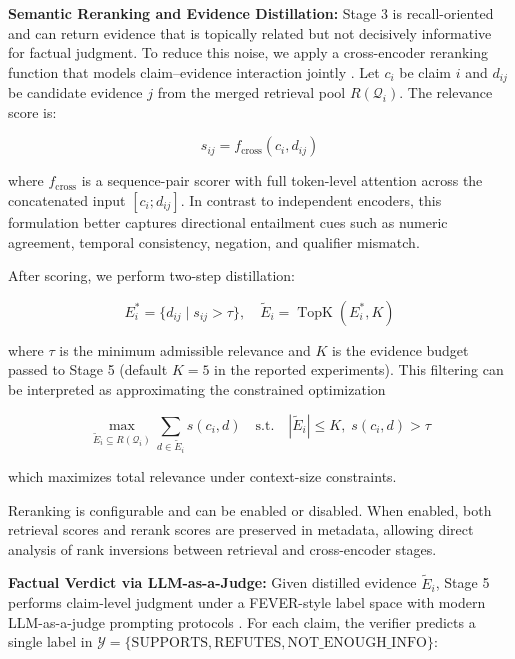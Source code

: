 \documentclass[sn-mathphys, oneside]{sn-jnl}
\begin{document}
\textbf{Semantic Reranking and Evidence Distillation:} Stage 3 is recall-oriented and can return evidence that is topically related but not decisively informative for factual judgment. To reduce this noise, we apply a cross-encoder reranking function that models claim--evidence interaction jointly \cite{nogueira2019bert,bge2023embedding}. Let $c_i$ be claim $i$ and $d_{ij}$ be candidate evidence $j$ from the merged retrieval pool $R(\mathcal{Q}_i)$. The relevance score is:

\begin{equation}
    s_{ij} = f_{\mathrm{cross}}(c_i, d_{ij})
    \label{eq:cross_score}
\end{equation}

where $f_{\mathrm{cross}}$ is a sequence-pair scorer with full token-level attention across the concatenated input $[c_i;d_{ij}]$. In contrast to independent encoders, this formulation better captures directional entailment cues such as numeric agreement, temporal consistency, negation, and qualifier mismatch.

After scoring, we perform two-step distillation:

\begin{equation}
    E_i^{*} = \{d_{ij} \mid s_{ij} > \tau\}, \quad
    \widetilde{E}_i = \operatorname{TopK}(E_i^{*}, K)
    \label{eq:topk_filter}
\end{equation}

where $\tau$ is the minimum admissible relevance and $K$ is the evidence budget passed to Stage 5 (default $K=5$ in the reported experiments). This filtering can be interpreted as approximating the constrained optimization

\begin{equation}
\max_{\widetilde{E}_i \subseteq R(\mathcal{Q}_i)} \sum_{d \in \widetilde{E}_i} s(c_i,d)
\quad \text{s.t.} \quad |\widetilde{E}_i| \le K,\; s(c_i,d)>\tau
\label{eq:stage4_constrained}
\end{equation}

which maximizes total relevance under context-size constraints.

Reranking is configurable and can be enabled or disabled. When enabled, both retrieval scores and rerank scores are preserved in metadata, allowing direct analysis of rank inversions between retrieval and cross-encoder stages.

\textbf{Factual Verdict via LLM-as-a-Judge:} Given distilled evidence $\widetilde{E}_i$, Stage 5 performs claim-level judgment under a FEVER-style label space \cite{thorne2018fever} with modern LLM-as-a-judge prompting protocols \cite{zheng2023judging}. For each claim, the verifier predicts a single label in
$\mathcal{Y}=\{\mathrm{SUPPORTS},\mathrm{REFUTES},\mathrm{NOT\_ENOUGH\_INFO}\}$:
\end{document}

